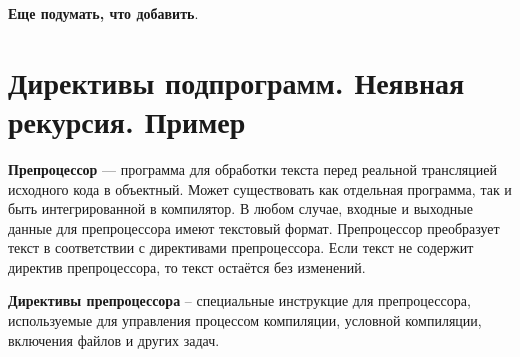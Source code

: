 {\LARGE \textbf{Еще подумать, что добавить}}.
\vspace{50pt}



\section{Директивы подпрограмм. Неявная рекурсия. Пример}

\textbf{Препроцессор} --- программа для обработки текста перед реальной трансляцией исходного кода в объектный. Может существовать как отдельная программа, так и быть интегрированной в компилятор. В любом случае, входные и выходные данные для препроцессора имеют текстовый формат. Препроцессор преобразует текст в соответствии с директивами препроцессора. Если текст не содержит директив препроцессора, то текст остаётся без изменений.

\textbf{Директивы препроцессора} -- специальные инструкцие для препроцессора, используемые для управления процессом компиляции, условной компиляции, включения файлов и других задач. 
\vspace{5pt}

